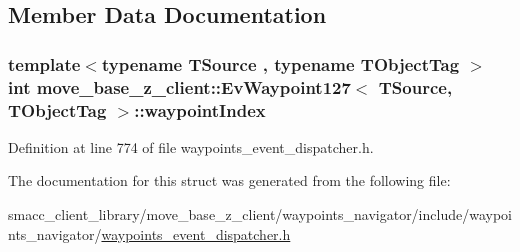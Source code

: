 \subsection{Member Data Documentation}
\subsubsection[{\texorpdfstring{waypoint\+Index}{waypointIndex}}]{\setlength{\rightskip}{0pt plus 5cm}template$<$typename T\+Source , typename T\+Object\+Tag $>$ int {\bf move\+\_\+base\+\_\+z\+\_\+client\+::\+Ev\+Waypoint127}$<$ T\+Source, T\+Object\+Tag $>$\+::waypoint\+Index}\hypertarget{structmove__base__z__client_1_1EvWaypoint127_a66d99034348272d0f897623bf0d4b859}{}\label{structmove__base__z__client_1_1EvWaypoint127_a66d99034348272d0f897623bf0d4b859}


Definition at line 774 of file waypoints\+\_\+event\+\_\+dispatcher.\+h.



The documentation for this struct was generated from the following file\+:\begin{DoxyCompactItemize}
\item 
smacc\+\_\+client\+\_\+library/move\+\_\+base\+\_\+z\+\_\+client/waypoints\+\_\+navigator/include/waypoints\+\_\+navigator/\hyperlink{waypoints__event__dispatcher_8h}{waypoints\+\_\+event\+\_\+dispatcher.\+h}\end{DoxyCompactItemize}

